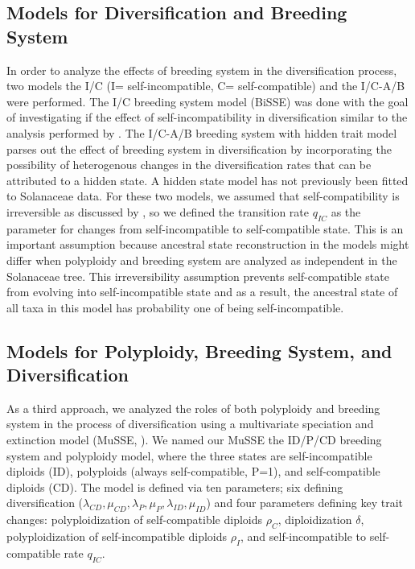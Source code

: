 \subsection{Models for Diversification and Breeding System}
In order to analyze the effects of breeding system in the diversification process, two models the I/C (I= self-incompatible, C= self-compatible) and the I/C-A/B were performed. The I/C breeding system model (BiSSE) was done with the goal of investigating if the effect of self-incompatibility in diversification similar to the analysis performed by \citet{goldberg_2012}. The I/C-A/B  breeding system with hidden trait model parses out the effect of breeding system in diversification by incorporating the possibility of heterogenous changes in the diversification rates that can be attributed to a hidden state. A hidden state model has not previously been fitted to Solanaceae data. For these two models, we assumed that self-compatibility is irreversible as discussed by \citet{igic_2013}, so we defined the transition rate $q_{IC}$ as the parameter for changes from self-incompatible to self-compatible state. This is an important assumption because ancestral state reconstruction in the models might differ when polyploidy and breeding system are analyzed as independent  in the Solanaceae tree. This irreversibility assumption prevents self-compatible state from evolving into self-incompatible state and as a result, the ancestral state of all taxa in this model has probability one of being self-incompatible.   %

\subsection{Models for Polyploidy, Breeding System, and Diversification}
As a third approach, we analyzed the roles of both polyploidy and breeding system in the process of diversification using a multivariate speciation and extinction model (MuSSE, \citet{fitzjohn_2012}).  We named our MuSSE the ID/P/CD breeding system and polyploidy model, where the three states are self-incompatible diploids (ID), polyploids (always self-compatible, P=1), and self-compatible diploids (CD). The model is defined via ten parameters; six defining diversification ($\lambda_{CD}, \mu_{CD},\lambda_{P},\mu_{P}, \lambda_{ID},\mu_{ID}$) and  four parameters defining key trait changes: polyploidization of self-compatible diploids $\rho_{C}$, diploidization $\delta$, polyploidization of self-incompatible diploids $\rho_{I}$, and self-incompatible to self-compatible rate $q_{IC}$.

